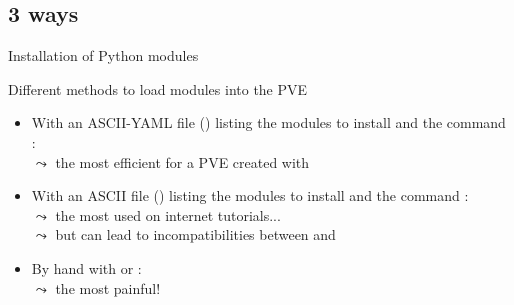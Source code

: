 \documentclass[10pt,serif,mathserif,compress,hyperref={colorlinks}]{beamer}
\begin{document}
\subsection{3 ways}

\begin{frame}{Installation of Python modules}
  
  \begin {bclogo}[noborder=true, couleur=gray!50, couleurBarre=Chocolate, logo=\bctrombone, marge=0, margeG=-.8]
    {Different methods to load modules into the  PVE}\medskip
    
     \begin{itemize}
     \item With an ASCII-YAML file () listing the modules to install and
       the command :\\[1mm]
       $\leadsto$ the most efficient for a PVE created with \medskip
      
     \item With an ASCII file () listing the modules to install and
       the command :\\
       $\leadsto$ the most used on internet tutorials... \\
       $\leadsto$ but can lead to incompatibilities between  and \medskip
      
     \item By hand with  or :\\
       $\leadsto$ the most painful!
     \end{itemize}    
  \end{bclogo}

\end{frame}
\end{document}
